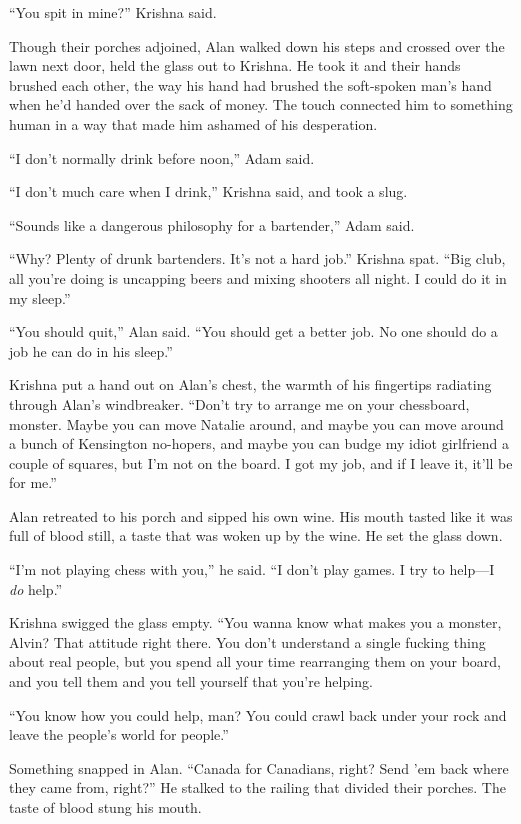 \documentclass{article}
\begin{document}
``You spit in mine?'' Krishna said.

Though their porches adjoined, Alan walked down his steps and crossed
over the lawn next door, held the glass out to Krishna.  He took it
and their hands brushed each other, the way his hand had brushed the
soft-spoken man's hand when he'd handed over the sack of money.  The
touch connected him to something human in a way that made him ashamed
of his desperation.

``I don't normally drink before noon,'' Adam said.

``I don't much care when I drink,'' Krishna said, and took a slug.

``Sounds like a dangerous philosophy for a bartender,'' Adam said.

``Why?  Plenty of drunk bartenders.  It's not a hard job.'' Krishna
spat.  ``Big club, all you're doing is uncapping beers and mixing
shooters all night.  I could do it in my sleep.''

``You should quit,'' Alan said.  ``You should get a better job.  No
one should do a job he can do in his sleep.''

Krishna put a hand out on Alan's chest, the warmth of his fingertips
radiating through Alan's windbreaker.  ``Don't try to arrange me on
your chessboard, monster.  Maybe you can move Natalie around, and
maybe you can move around a bunch of Kensington no-hopers, and maybe
you can budge my idiot girlfriend a couple of squares, but I'm not on
the board.  I got my job, and if I leave it, it'll be for me.''

Alan retreated to his porch and sipped his own wine.  His mouth tasted
like it was full of blood still, a taste that was woken up by the
wine.  He set the glass down.

``I'm not playing chess with you,'' he said.  ``I don't play games.  I
try to help---I \textit{do} help.''

Krishna swigged the glass empty.  ``You wanna know what makes you a
monster, Alvin?  That attitude right there.  You don't understand a
single fucking thing about real people, but you spend all your time
rearranging them on your board, and you tell them and you tell
yourself that you're helping.

``You know how you could help, man?  You could crawl back under your
rock and leave the people's world for people.''

Something snapped in Alan.  ``Canada for Canadians, right?  Send 'em
back where they came from, right?'' He stalked to the railing that
divided their porches.  The taste of blood stung his mouth.
\end{document}
